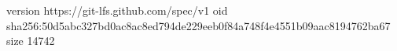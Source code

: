 version https://git-lfs.github.com/spec/v1
oid sha256:50d5abc327bd0ac8ac8ed794de229eeb0f84a748f4e4551b09aac8194762ba67
size 14742
